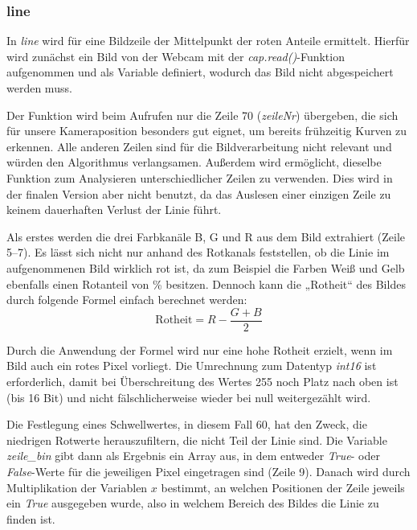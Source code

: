 \documentclass[a4paper, 12pt]{scrartcl}
\begin{document}
\subsubsection{line}


In \textit{line} wird für eine Bildzeile der Mittelpunkt der roten Anteile ermittelt. Hierfür wird zunächst ein Bild von der Webcam mit der \textit{cap.read()}-Funktion aufgenommen und als Variable definiert, wodurch das Bild nicht abgespeichert werden muss. 

Der Funktion wird beim Aufrufen nur die Zeile 70 (\textit{zeileNr}) übergeben, die sich für unsere Kameraposition besonders gut eignet, um bereits frühzeitig Kurven zu erkennen. Alle anderen Zeilen sind für die Bildverarbeitung nicht relevant und würden den Algorithmus verlangsamen. Außerdem wird ermöglicht, dieselbe Funktion zum Analysieren unterschiedlicher Zeilen zu verwenden. Dies wird in der finalen Version aber nicht benutzt, da das Auslesen einer einzigen Zeile zu keinem dauerhaften Verlust der Linie führt.

Als erstes werden die drei Farbkanäle B, G und R aus dem Bild extrahiert (Zeile 5--7). Es lässt sich nicht nur anhand des Rotkanals feststellen, ob die Linie im aufgenommenen Bild wirklich rot ist, da zum Beispiel die Farben Weiß und Gelb ebenfalls einen Rotanteil von \unit[100]{\%} besitzen. Dennoch kann die „Rotheit“ des Bildes durch folgende Formel einfach berechnet werden:
\begin{equation}
\text{Rotheit} = R-\frac{G+B}{2}
\end{equation}

Durch die Anwendung der Formel wird nur eine hohe Rotheit erzielt, wenn im Bild auch ein rotes Pixel vorliegt. Die Umrechnung zum Datentyp \textit{int16} ist erforderlich, damit bei Überschreitung des Wertes 255 noch Platz nach oben ist (bis 16 Bit) und nicht fälschlicherweise wieder bei null weitergezählt wird.

Die Festlegung eines Schwellwertes, in diesem Fall 60, hat den Zweck, die niedrigen Rotwerte herauszufiltern, die nicht Teil der Linie sind. Die Variable \textit{zeile\_bin} gibt dann als Ergebnis ein Array aus, in dem entweder \textit{True}- oder \textit{False}-Werte für die jeweiligen Pixel eingetragen sind  (Zeile 9). Danach wird durch Multiplikation der Variablen $x$ bestimmt, an welchen Positionen der Zeile jeweils ein \textit{True} ausgegeben wurde, also in welchem Bereich des Bildes die Linie zu finden ist. 
\end{document}
